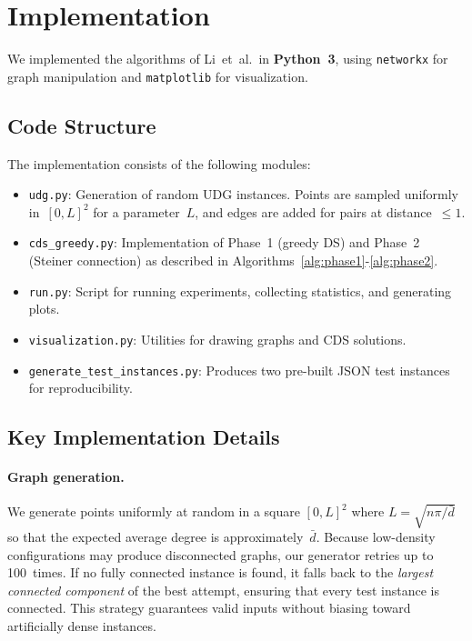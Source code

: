 \documentclass[11pt,a4paper]{article}
\begin{document}
\section{Implementation}\label{sec:implementation}

We implemented the algorithms of Li~et~al.\ in \textbf{Python~3}, using
\texttt{networkx} for graph manipulation and \texttt{matplotlib} for
visualization.

\subsection{Code Structure}

The implementation consists of the following modules:

\begin{itemize}[nosep]
  \item \texttt{udg.py}: Generation of random UDG instances. Points are
        sampled uniformly in~$[0, L]^2$ for a parameter~$L$, and edges are
        added for pairs at distance~$\leq 1$.
  \item \texttt{cds\_greedy.py}: Implementation of Phase~1 (greedy DS) and
        Phase~2 (Steiner connection) as described in
        Algorithms~\ref{alg:phase1}-\ref{alg:phase2}.
  \item \texttt{run.py}: Script for running experiments, collecting
        statistics, and generating plots.
  \item \texttt{visualization.py}: Utilities for drawing graphs and CDS
        solutions.
  \item \texttt{generate\_test\_instances.py}: Produces two pre-built JSON
        test instances for reproducibility.
\end{itemize}

\subsection{Key Implementation Details}

\paragraph{Graph generation.}
We generate points uniformly at random in a square $[0, L]^2$ where
$L = \sqrt{n\pi / \bar{d}}$ so that the expected average degree is
approximately~$\bar{d}$.  Because low-density configurations may produce
disconnected graphs, our generator retries up to 100~times.  If no fully
connected instance is found, it falls back to the \emph{largest connected
component} of the best attempt, ensuring that every test instance is connected.
This strategy guarantees valid inputs without biasing toward artificially dense
instances.
\end{document}
